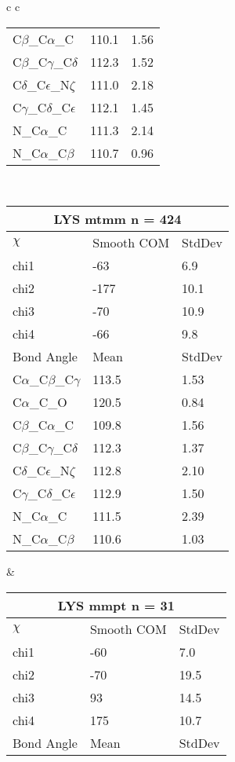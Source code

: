 \begin{longtable}{ c c }
\begin{tabular}{ l l l }
  C$\beta$\_C$\alpha$\_C & 110.1 & 1.56\\
  C$\beta$\_C$\gamma$\_C$\delta$ & 112.3 & 1.52\\
  C$\delta$\_C$\epsilon$\_N$\zeta$ & 111.0 & 2.18\\
  C$\gamma$\_C$\delta$\_C$\epsilon$ & 112.1 & 1.45\\
  N\_C$\alpha$\_C & 111.3 & 2.14\\
  N\_C$\alpha$\_C$\beta$ & 110.7 & 0.96\\
  \bottomrule
  \end{tabular}
  \\
  \begin{tabular}{ l l l }
  \toprule
  \multicolumn{3}{c}{LYS \textbf{mtmm} n = 424} \\ \toprule
  $\chi$       & Smooth COM & StdDev \\ \midrule
  chi1 & -63 & 6.9 \\ 
  chi2 & -177 & 10.1 \\ 
  chi3 & -70 & 10.9 \\ 
  chi4 & -66 & 9.8 \\ \midrule
  Bond Angle   & Mean     & StdDev \\ \midrule
  C$\alpha$\_C$\beta$\_C$\gamma$ & 113.5 & 1.53\\
  C$\alpha$\_C\_O & 120.5 & 0.84\\
  C$\beta$\_C$\alpha$\_C & 109.8 & 1.56\\
  C$\beta$\_C$\gamma$\_C$\delta$ & 112.3 & 1.37\\
  C$\delta$\_C$\epsilon$\_N$\zeta$ & 112.8 & 2.10\\
  C$\gamma$\_C$\delta$\_C$\epsilon$ & 112.9 & 1.50\\
  N\_C$\alpha$\_C & 111.5 & 2.39\\
  N\_C$\alpha$\_C$\beta$ & 110.6 & 1.03\\
  \bottomrule
  \end{tabular}
  &
  \begin{tabular}{ l l l }
  \toprule
  \multicolumn{3}{c}{LYS \textbf{mmpt} n = 31} \\ \toprule
  $\chi$       & Smooth COM & StdDev \\ \midrule
  chi1 & -60 & 7.0 \\ 
  chi2 & -70 & 19.5 \\ 
  chi3 & 93 & 14.5 \\ 
  chi4 & 175 & 10.7 \\ \midrule
  Bond Angle   & Mean     & StdDev \\ \midrule

\end{tabular}
\end{longtable}
